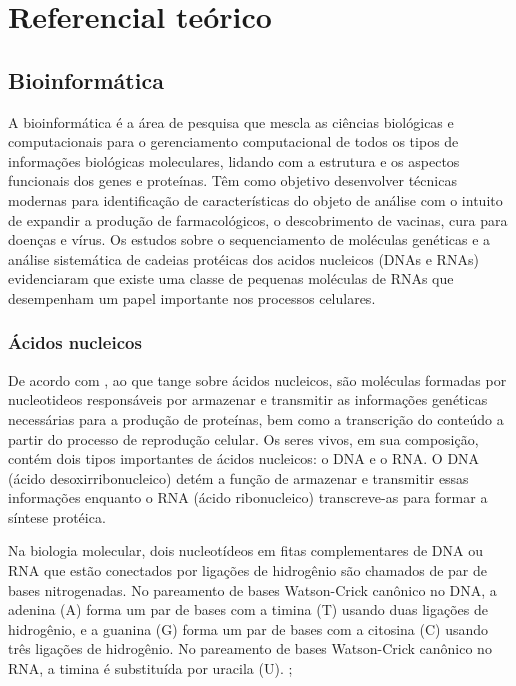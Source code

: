 \chapter{Referencial teórico}

\section{Bioinformática}

A bioinformática é a área de pesquisa que mescla as ciências biológicas e computacionais para o gerenciamento computacional de todos os tipos de informações biológicas moleculares, lidando com a estrutura e os aspectos funcionais dos genes e proteínas. Têm como objetivo desenvolver técnicas modernas para identificação de características do objeto de análise com o intuito de expandir a produção de farmacológicos, o descobrimento de vacinas, cura para doenças e vírus. Os estudos sobre o sequenciamento de moléculas genéticas e a análise sistemática de cadeias protéicas dos acidos nucleicos (DNAs e RNAs) evidenciaram que existe uma classe de pequenas moléculas de RNAs que desempenham um papel importante nos processos celulares. \cite{bio-info}

\subsection{Ácidos nucleicos}

De acordo com \cite{nucleic-acid}, ao que tange sobre ácidos nucleicos, são moléculas formadas por nucleotideos responsáveis por armazenar e transmitir as informações genéticas necessárias para a produção de proteínas, bem como a transcrição do conteúdo a partir do processo de reprodução celular. Os seres vivos, em sua composição, contém dois tipos importantes de ácidos nucleicos: o DNA e o RNA. O DNA (ácido desoxirribonucleico) detém a função de armazenar e transmitir essas informações enquanto o RNA (ácido ribonucleico) transcreve-as para formar a síntese protéica. 

Na biologia molecular, dois nucleotídeos em fitas complementares de DNA ou RNA que estão conectados por ligações de hidrogênio são chamados de par de bases nitrogenadas. No pareamento de bases Watson-Crick canônico no DNA, a adenina (A) forma um par de bases com a timina (T) usando duas ligações de hidrogênio, e a guanina (G) forma um par de bases com a citosina (C) usando três ligações de hidrogênio. No pareamento de bases Watson-Crick canônico no RNA, a timina é substituída por uracila (U). \cite{watson-crick-pair};

